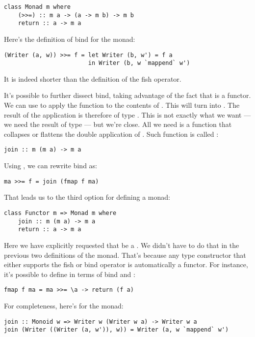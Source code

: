 \begin{verbatim}
class Monad m where
    (>>=) :: m a -> (a -> m b) -> m b
    return :: a -> m a
\end{verbatim}
Here's the definition of bind for the  monad:

\begin{verbatim}
(Writer (a, w)) >>= f = let Writer (b, w') = f a 
                        in Writer (b, w `mappend` w')
\end{verbatim}
It is indeed shorter than the definition of the fish operator.

It's possible to further dissect bind, taking advantage of the fact that
 is a functor. We can use  to apply the function
 to the contents of . This
will turn  into . The result of the application
is therefore of type . This is not exactly what we
want --- we need the result of type  --- but we're close.
All we need is a function that collapses or flattens the double
application of . Such function is called :

\begin{verbatim}
join :: m (m a) -> m a
\end{verbatim}
Using , we can rewrite bind as:

\begin{verbatim}
ma >>= f = join (fmap f ma)
\end{verbatim}
That leads us to the third option for defining a monad:

\begin{verbatim}
class Functor m => Monad m where
    join :: m (m a) -> m a
    return :: a -> m a
\end{verbatim}
Here we have explicitly requested that  be a .
We didn't have to do that in the previous two definitions of the monad.
That's because any type constructor  that either supports the
fish or bind operator is automatically a functor. For instance, it's
possible to define  in terms of bind and :

\begin{verbatim}
fmap f ma = ma >>= \a -> return (f a)
\end{verbatim}
For completeness, here's  for the  monad:

\begin{verbatim}
join :: Monoid w => Writer w (Writer w a) -> Writer w a
join (Writer ((Writer (a, w')), w)) = Writer (a, w `mappend` w')
\end{verbatim}

